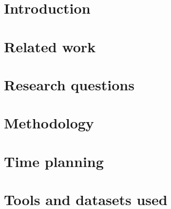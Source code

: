
\section{Introduction}


\section{Related work}


\section{Research questions}


\section{Methodology}


\section{Time planning}


\section{Tools and datasets used}

